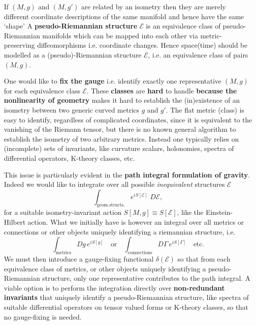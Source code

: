\begin{mytheorem}
%
If \((M,g)\) and \((M,g')\) are related by an isometry then they are merely different coordinate descriptions of the same manifold and hence have the same `shape'
%
A \textbf{pseudo-Riemannian structure} \(\mathcal{E}\) is an equivalence class of pseudo-Riemannian manifolds which can be mapped into each other via metric-preserving diffeomorphisms i.e. coordinate changes.
Hence space(time) should be modelled as a (pseudo)-Riemannian structure \(\mathcal{E}\), i.e. an equivalence class of pairs \((M,g)\).

One would like to \textbf{fix the gauge} i.e. identify exactly one representative \((M,g)\) for each equivalence class \(\mathcal{E}\).
These \textbf{classes} are \textbf{hard} to handle \textbf{because the nonlinearity of geometry} makes it hard to establish the (in)existence of an isometry between two generic curved metrics \(g\) and \(g'\).
The flat metric (class) is easy to identify, regardless of complicated coordinates, since it is equivalent to the vanishing of the Riemann tensor, but there is no known general algorithm to establish the isometry of two arbitrary metrics.
Instead one typically relies on (incomplete) sets of invariants, like curvature scalars, holonomies, spectra of differential operators, K-theory classes, etc.

This issue is particularly evident in the \textbf{path integral formulation of gravity}.
Indeed we would like to integrate over all possible \emph{inequivalent} structures \(\mathcal{E}\)
\begin{equation}
    \int_{\mathrm{geom. structs.}} e^{i S[\mathcal{E}]} \;D\mathcal{E},
\end{equation}
for a suitable isometry-invariant action $S[M,g]\equiv S[\mathcal{E}]$, like the Einstein-Hilbert action.
%
What we initially have is however an integral over all metrics or connections or other objects uniquely identifying a riemannian structure, i.e.
\begin{equation}
    \int_{\mathrm{metrics}} \!\!Dg\, e^{i S[g]} 
    \quad \text{or} \quad
    \int_{\mathrm{connections}}\!\!D\Gamma\,  e^{i S[\Gamma]}\quad \text{etc.}
\end{equation}
%
We must then introduce a gauge-fixing functional \(\delta(\mathcal{E})\) so that from each equivalence class of metrics, or other objects uniquely identifying a pseudo-Riemannian structure, only one representative contributes to the path integral.
%
A viable option is to perform the integration directly over \textbf{non-redundant invariants} that uniquely identify a pseudo-Riemannian structure, like spectra of suitable differential operators on tensor valued forms or K-theory classes, so that no gauge-fixing is needed.


\end{mytheorem}
